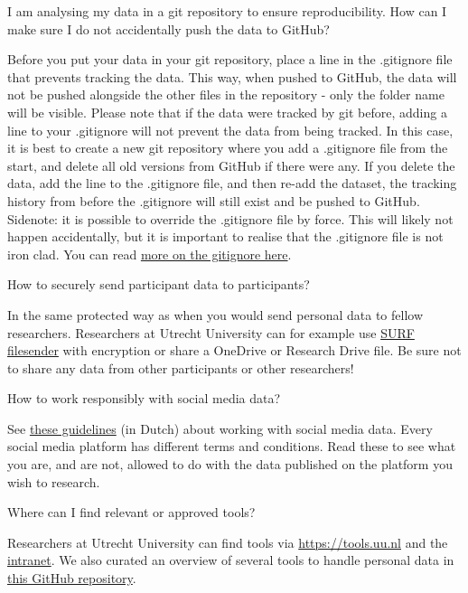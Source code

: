 \documentclass[
]{book}
\begin{document}
I am analysing my data in a git repository to ensure reproducibility. How can I make sure I do not accidentally push the data to GitHub?

Before you put your data in your git repository, place a line in the .gitignore file that prevents tracking the data. This way, when pushed to GitHub, the data will not be pushed alongside the other files in the repository - only the folder name will be visible. Please note that if the data were tracked by git before, adding a line to your .gitignore will not prevent the data from being tracked. In this case, it is best to create a new git repository where you add a .gitignore file from the start, and delete all old versions from GitHub if there were any. If you delete the data, add the line to the .gitignore file, and then re-add the dataset, the tracking history from before the .gitignore will still exist and be pushed to GitHub. Sidenote: it is possible to override the .gitignore file by force. This will likely not happen accidentally, but it is important to realise that the .gitignore file is not iron clad. You can read \href{https://the-turing-way.netlify.app/project-design/sdpw/pd-sdp-sensitive-files.html}{more on the gitignore here}.

How to securely send participant data to participants?

In the same protected way as when you would send personal data to fellow researchers. Researchers at Utrecht University can for example use \href{https://filesender.surf.nl/}{SURF filesender} with encryption or share a OneDrive or Research Drive file. Be sure not to share any data from other participants or other researchers!

How to work responsibly with social media data?

See \href{https://doi.org/10.33540/1874/406645}{these guidelines} (in Dutch) about working with social media data. Every social media platform has different terms and conditions. Read these to see what you are, and are not, allowed to do with the data published on the platform you wish to research.

Where can I find relevant or approved tools?

Researchers at Utrecht University can find tools via \url{https://tools.uu.nl} and the \href{https://intranet.uu.nl/en/knowledgebase/software-at-work-teaching-rooms-and-home}{intranet}. We also curated an overview of several tools to handle personal data in \href{https://github.com/UtrechtUniversity/privacy-engineering-tools/}{this GitHub repository}.
\end{document}
